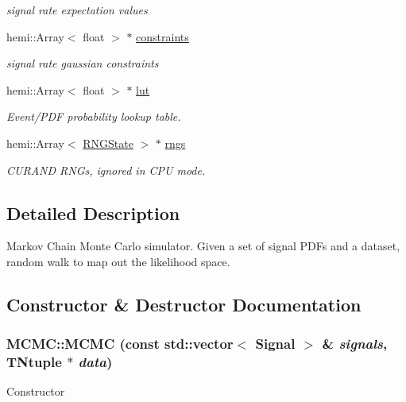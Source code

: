 \begin{DoxyCompactItemize}
\begin{DoxyCompactList}\small\item\em signal rate expectation values \item\end{DoxyCompactList}\item 
\hypertarget{classMCMC_a78188ea2b8b1ebc7fde5d82373601532}{
hemi::Array$<$ float $>$ $\ast$ \hyperlink{classMCMC_a78188ea2b8b1ebc7fde5d82373601532}{constraints}}
\label{classMCMC_a78188ea2b8b1ebc7fde5d82373601532}

\begin{DoxyCompactList}\small\item\em signal rate gaussian constraints \item\end{DoxyCompactList}\item 
\hypertarget{classMCMC_a9ddda71766bb7340985199d8d0557bb6}{
hemi::Array$<$ float $>$ $\ast$ \hyperlink{classMCMC_a9ddda71766bb7340985199d8d0557bb6}{lut}}
\label{classMCMC_a9ddda71766bb7340985199d8d0557bb6}

\begin{DoxyCompactList}\small\item\em Event/PDF probability lookup table. \item\end{DoxyCompactList}\item 
\hypertarget{classMCMC_a84bc0adf94974a520b1227190f020917}{
hemi::Array$<$ \hyperlink{nll__kernels_8h_aa4f3692120f92f1d2ab38f02ca8f86ad}{RNGState} $>$ $\ast$ \hyperlink{classMCMC_a84bc0adf94974a520b1227190f020917}{rngs}}
\label{classMCMC_a84bc0adf94974a520b1227190f020917}

\begin{DoxyCompactList}\small\item\em CURAND RNGs, ignored in CPU mode. \item\end{DoxyCompactList}\end{DoxyCompactItemize}


\subsection{Detailed Description}
Markov Chain Monte Carlo simulator. Given a set of signal PDFs and a dataset, random walk to map out the likelihood space. 

\subsection{Constructor \& Destructor Documentation}
\hypertarget{classMCMC_a6b770d2197d45c0fcc136294fbeec672}{
\subsubsection[{MCMC}]{\setlength{\rightskip}{0pt plus 5cm}MCMC::MCMC (const std::vector$<$ {\bf Signal} $>$ \& {\em signals}, \/  TNtuple $\ast$ {\em data})}}
\label{classMCMC_a6b770d2197d45c0fcc136294fbeec672}
Constructor


